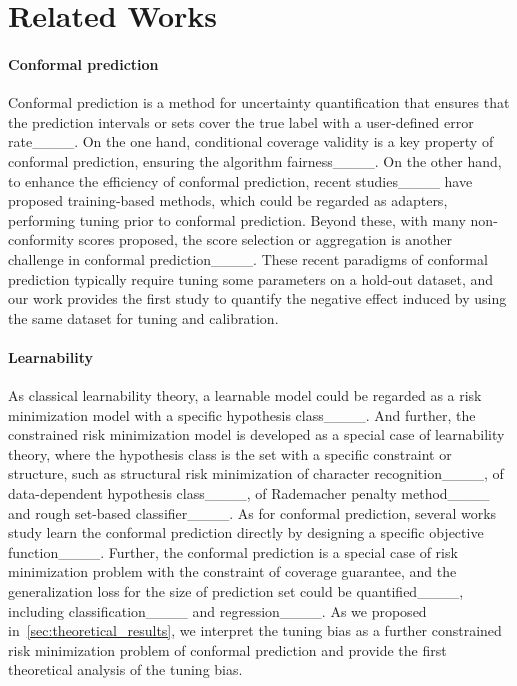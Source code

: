 \section{Related Works}
\label{sec:related_work}

\paragraph{Conformal prediction}
Conformal prediction is a method for uncertainty quantification that ensures that the prediction intervals or sets cover the true label with a user-defined error rate____. 
On the one hand, conditional coverage validity is a key property of conformal prediction, ensuring the algorithm fairness____.
On the other hand, to enhance the efficiency of conformal prediction, recent studies____ have proposed training-based methods, which could be regarded as adapters, performing tuning prior to conformal prediction.
Beyond these, with many non-conformity scores proposed, the score selection or aggregation is another challenge in conformal prediction____.
These recent paradigms of conformal prediction typically require tuning some parameters on a hold-out dataset, and our work provides the first study to quantify the negative effect induced by using the same dataset for tuning and calibration.


\paragraph{Learnability}
As classical learnability theory, a learnable model could be regarded as a risk minimization model with a specific hypothesis class____.
And further, the constrained risk minimization model is developed as a special case of learnability theory, where the hypothesis class is the set with a specific constraint or structure, such as structural risk minimization of character recognition____, of data-dependent hypothesis class____, of Rademacher penalty method____ and rough set-based classifier____.
As for conformal prediction, several works study learn the conformal prediction directly by designing a specific objective function____. 
Further, the conformal prediction is a special case of risk minimization problem with the constraint of coverage guarantee, and the generalization loss for the size of prediction set could be quantified____, including classification____ and regression____.
As we proposed in~\cref{sec:theoretical_results}, we interpret the tuning bias as a further constrained risk minimization problem of conformal prediction and provide the first theoretical analysis of the tuning bias.

